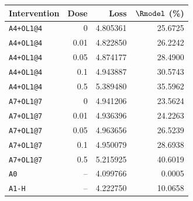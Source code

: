 \begin{tabular}{lrrr}
\toprule
Intervention & Dose & Loss & $\Rmodel$ (\%) \\
\midrule
\texttt{A4+OL1@4} & 0 & 4.805361 & 25.6725 \\
\texttt{A4+OL1@4} & 0.01 & 4.822850 & 26.2242 \\
\texttt{A4+OL1@4} & 0.05 & 4.874177 & 28.4900 \\
\texttt{A4+OL1@4} & 0.1 & 4.943887 & 30.5743 \\
\texttt{A4+OL1@4} & 0.5 & 5.389480 & 35.5962 \\
\texttt{A7+OL1@7} & 0 & 4.941206 & 23.5624 \\
\texttt{A7+OL1@7} & 0.01 & 4.936396 & 24.2263 \\
\texttt{A7+OL1@7} & 0.05 & 4.963656 & 26.5239 \\
\texttt{A7+OL1@7} & 0.1 & 4.950079 & 28.6938 \\
\texttt{A7+OL1@7} & 0.5 & 5.215925 & 40.6019 \\
\texttt{A0} & -- & 4.099766 & 0.0005 \\
\texttt{A1-H} & -- & 4.222750 & 10.0658 \\
\bottomrule
\end{tabular}
